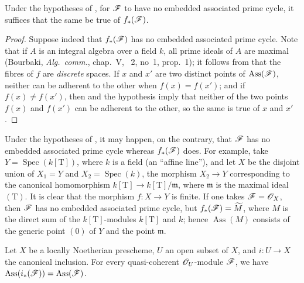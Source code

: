 \begin{corollary}[3.1.11]
\label{IV.3.1.11}
Under the hypotheses of , for $\mathscr{F}$ to have no embedded associated prime cycle, it suffices that the same be true of $f_*(\mathscr{F})$.
\end{corollary}

\begin{proof}
Suppose indeed that $f_*(\mathscr{F})$ has no embedded associated prime cycle.
Note that if $A$ is an integral algebra over a field $k$, all prime ideals of $A$ are maximal (Bourbaki, \emph{Alg.\ comm.}, chap.~V, \textsection~2, no~1, prop.~1); it follows from  that the fibres of $f$ are \emph{discrete} spaces. If $x$ and $x'$ are two distinct points of $\operatorname{Ass}(\mathscr{F})$, neither can be adherent to the other when $f(x)=f(x')$; and if $f(x)\neq f(x')$, then  and the hypothesis imply that neither of the two points $f(x)$ and $f(x')$ can be adherent to the other, so the same is true of $x$ and $x'$.
\end{proof}

\begin{remark}[3.1.12]
\label{IV.3.1.12}
Under the hypotheses of , it may happen, on the contrary, that $\mathscr{F}$ has no embedded associated prime cycle whereas $f_*(\mathscr{F})$ does.
For example, take $Y=\operatorname{Spec}(k[\mathrm{T}])$, where $k$ is a field (an ``affine line''), and let $X$ be the disjoint union of $X_1=Y$ and $X_2=\operatorname{Spec}(k)$, the morphism $X_2\to Y$ corresponding to the canonical homomorphism $k[\mathrm{T}]\to k[\mathrm{T}]/\mathfrak{m}$, where $\mathfrak{m}$ is the maximal ideal $(\mathrm{T})$.
It is clear that the morphism $f:X\to Y$ is finite. If one takes $\mathscr{F}=\mathscr{O}_X$, then $\mathscr{F}$ has no embedded associated prime cycle, but $f_*(\mathscr{F})=\widetilde{M}$, where $M$ is the direct sum of the $k[\mathrm{T}]$-modules $k[\mathrm{T}]$ and $k$; hence $\operatorname{Ass}(M)$ consists of the generic point $(0)$ of $Y$ and the point $\mathfrak{m}$.
\end{remark}

\begin{proposition}[3.1.13]
\label{IV.3.1.13}
Let $X$ be a locally Noetherian prescheme, $U$ an open subset of $X$, and $i:U\to X$ the canonical inclusion.
For every quasi-coherent $\mathscr{O}_U$-module $\mathscr{F}$, we have $\operatorname{Ass}(i_*(\mathscr{F}))=\operatorname{Ass}(\mathscr{F})$.
\end{proposition}

